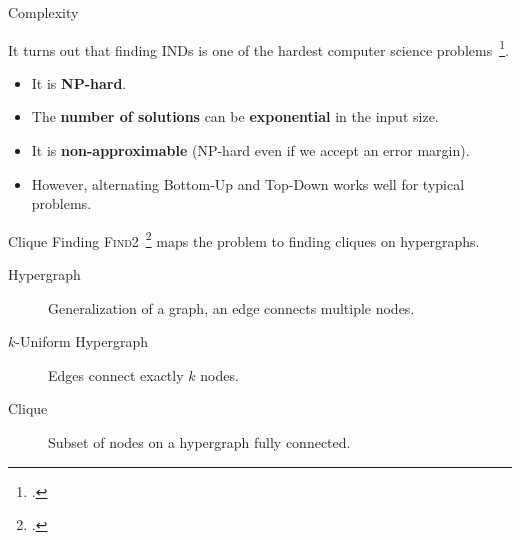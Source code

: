\documentclass[10pt,compress]{beamer}
\begin{document}
\begin{frame}{Complexity}

    It turns out that finding INDs is one of the hardest computer science
    problems~\footcite{Blsius2017}.
    
    \begin{itemize}
        \item It is \textbf{NP-hard}.
        \item The \textbf{number of solutions} can be \textbf{exponential} in the input size.
        \item It is \textbf{non-approximable} (NP-hard even if we accept an error margin).
        \item However, alternating Bottom-Up and Top-Down works well for
            typical problems.
    \end{itemize}
    
    \bigskip

\end{frame}

\begin{frame}{Clique Finding}
    \textsc{Find2}~\footcite{koeller2003discovery} maps the problem to finding cliques on hypergraphs.
    \begin{description}
        \item[Hypergraph] Generalization of a graph, an edge connects multiple nodes.
        \item[$k$-Uniform Hypergraph] Edges connect exactly $k$ nodes.
        \item[Clique] Subset of nodes on a hypergraph fully connected.
    \end{description}
\end{frame}
\end{document}
